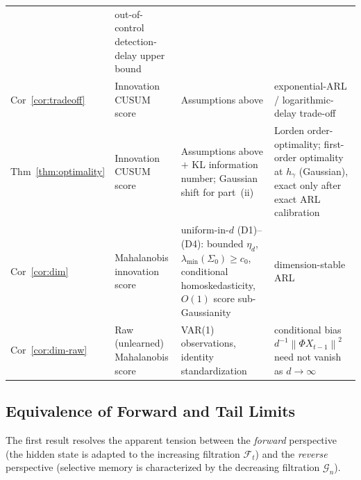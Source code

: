 \documentclass[bj,authoryear]{imsart}
\theoremstyle{plain}
\theoremstyle{definition}
\newcommand{\F}{\mathcal{F}}
\newcommand{\G}{\mathcal{G}}
\newcommand{\norm}[1]{\left\lVert #1 \right\rVert}
\begin{document}
\begin{table}[ht]
\begin{tabular}{@{}l p{2.3cm} p{4.0cm} p{3.4cm}@{}}
  & out-of-control detection-delay upper bound \\
Cor~\ref{cor:tradeoff} & Innovation CUSUM score
  & Assumptions above
  & exponential-ARL / logarithmic-delay trade-off \\
Thm~\ref{thm:optimality} & Innovation CUSUM score
  & Assumptions above $+$ KL information number; Gaussian shift for part~(ii)
  & Lorden order-optimality; first-order optimality at $h_\gamma$ (Gaussian),
    exact only after exact ARL calibration \\
Cor~\ref{cor:dim} & Mahalanobis innovation score
  & uniform-in-$d$ (D1)--(D4): bounded $\eta_d$, $\lambda_{\min}(\Sigma_0)\ge c_0$,
    conditional homoskedasticity, $O(1)$ score sub-Gaussianity
  & dimension-stable ARL \\
Cor~\ref{cor:dim-raw} & Raw (unlearned) Mahalanobis score
  & VAR(1) observations, identity standardization
  & conditional bias $d^{-1}\norm{\Phi X_{t-1}}^2$ need not vanish as
    $d\to\infty$ \\
\bottomrule
\end{tabular}
\end{table}

\subsection{Equivalence of Forward and Tail Limits}
\label{sec:lemma}

The first result resolves the apparent tension between the \emph{forward}
perspective (the hidden state is adapted to the increasing filtration $\F_t$)
and the \emph{reverse} perspective (selective memory is characterized by the
decreasing filtration $\G_n$).
\end{document}
